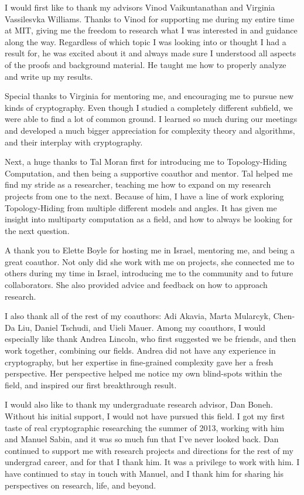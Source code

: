
I would first like to thank my advisors Vinod Vaikuntanathan and Virginia Vassilesvka Williams. Thanks to Vinod for supporting me during my entire time at MIT, giving me the freedom to research what I was interested in and guidance along the way. Regardless of which topic I was looking into or thought I had a result for, he was excited about it and always made sure I understood all aspects of the proofs and background material. He taught me how to properly analyze and write up my results.

Special thanks to Virginia for mentoring me, and encouraging me to pursue new kinds of cryptography. Even though I studied a completely different subfield, we were able to find a lot of common ground. I learned so much during our meetings and developed a much bigger appreciation for complexity theory and algorithms, and their interplay with cryptography.

Next, a huge thanks to Tal Moran first for introducing me to Topology-Hiding Computation, and then being a supportive coauthor and mentor. Tal helped me find my stride as a researcher, teaching me how to expand on my research projects from one to the next. Because of him, I have a line of work exploring Topology-Hiding from multiple different models and angles. It has given me insight into multiparty computation as a field, and how to always be looking for the next question.

A thank you to Elette Boyle for hosting me in Israel, mentoring me, and being a great coauthor. Not only did she work with me on projects, she connected me to others during my time in Israel, introducing me to the community and to future collaborators. She also provided advice and feedback on how to approach research.

I also thank all of the rest of my coauthors: Adi Akavia, Marta Mularcyk, Chen-Da Liu, Daniel Tschudi, and Uieli Mauer. Among my coauthors, I would especially like thank Andrea Lincoln, who first suggested we be friends, and then work together, combining our fields. Andrea did not have any experience in cryptography, but her expertise in fine-grained complexity gave her a fresh perspective. Her perspective helped me notice my own blind-spots within the field, and inspired our first breakthrough result.

I would also like to thank my undergraduate research advisor, Dan Boneh. Without his initial support, I would not have pursued this field. I got my first taste of real cryptographic researching the summer of 2013, working with him and Manuel Sabin, and it was so much fun that I've never looked back. Dan continued to support me with research projects and directions for the rest of my undergrad career, and for that I thank him. It was a privilege to work with him.
I have continued to stay in touch with Manuel, and I thank him for sharing his perspectives on research, life, and beyond.


